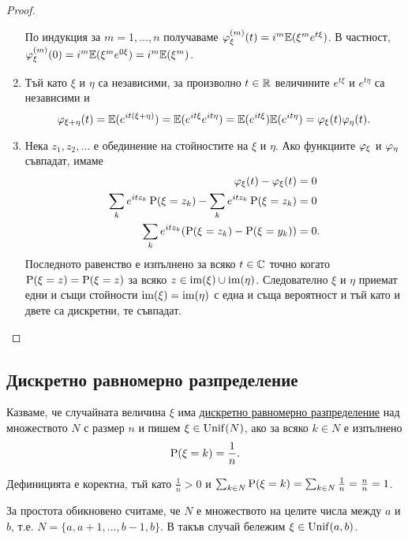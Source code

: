 \documentclass[numbers=endperiod, DIV=15, bibliography=totocnumbered]{scrartcl}
\begin{document}
\begin{proof}
\begin{enumerate}
    По индукция за $m = 1, \ldots, n$ получаваме $\varphi^{(m)}_\xi(t) = i^m \mathbb{E}(\xi^m e^{t \xi})$. В частност, $\varphi^{(m)}_\xi(0) = i^m \mathbb{E}(\xi^m e^{0 \xi}) = i^m \mathbb{E}(\xi^m)$.

    \item Тъй като $\xi$ и $\eta$ са независими, за произволно $t \in \mathbb{R}$ величините $e^{t\xi}$ и $e^{t\eta}$ са независими и
    \begin{displaymath}
      \varphi_{\xi + \eta}(t)
      =
      \mathbb{E}(e^{it(\xi + \eta)})
      =
      \mathbb{E}(e^{it\xi} e^{it\eta})
      =
      \mathbb{E}(e^{it\xi}) \mathbb{E}(e^{it\eta})
      =
      \varphi_\xi(t) \varphi_\eta(t).
    \end{displaymath}

    \item Нека $z_1, z_2, \ldots$ е обединение на стойностите на $\xi$ и $\eta$. Ако функциите $\varphi_\xi$ и $\varphi_\eta$ съвпадат, имаме
    \begin{align*}
      \varphi_\xi(t) - \varphi_\xi(t) &= 0
      \\
      \sum_k e^{i t z_k} \operatorname{P}(\xi = z_k) - \sum_k e^{i t z_k} \operatorname{P}(\xi = z_k) &= 0
      \\
      \sum_k e^{i t z_k} (\operatorname{P}(\xi = z_k) - \operatorname{P}(\xi = y_k)) &= 0.
    \end{align*}
    Последното равенство е изпълнено за всяко $t \in \mathbb{C}$ точно когато $\operatorname{P}(\xi = z) = \operatorname{P}(\xi = z)$ за всяко $z \in \operatorname{im}(\xi) \cup \operatorname{im}(\eta)$. Следователно $\xi$ и $\eta$ приемат едни и същи стойности $\operatorname{im}(\xi) = \operatorname{im}(\eta)$ с една и съща вероятност и тъй като и двете са дискретни, те съвпадат.
  \end{enumerate}
\end{proof}

\subsection{Дискретно равномерно разпределение}

\begin{definition}
  Казваме, че случайната величина $\xi$ има \underline{дискретно равномерно разпределение} над множеството $N$ с размер $n$ и пишем $\xi \in \operatorname{Unif}(N)$, ако за всяко $k \in N$ е изпълнено
  \begin{displaymath}
    \operatorname{P}(\xi = k) = \frac 1 n.
  \end{displaymath}

  Дефиницията е коректна, тъй като $\frac 1 n > 0$ и $\sum_{k \in N} \operatorname{P}(\xi = k) = \sum_{k \in N} \frac 1 n = \frac n n = 1$.

  За простота обикновено считаме, че $N$ е множеството на целите числа между $a$ и $b$, т.е. $N = \{ a, a + 1, \ldots, b - 1, b \}$. В такъв случай бележим $\xi \in \operatorname{Unif}(a, b)$.
\end{definition}
\end{document}
